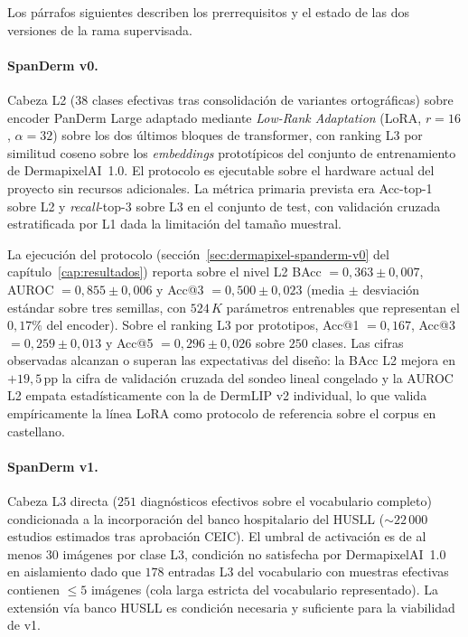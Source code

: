 Los párrafos siguientes describen los prerrequisitos y el estado
de las dos versiones de la rama supervisada.

\paragraph{SpanDerm v0.}
Cabeza L2 ($38$ clases efectivas tras consolidación de
variantes ortográficas) sobre encoder PanDerm Large adaptado
mediante \emph{Low-Rank Adaptation} (LoRA, $r=16$, $\alpha=32$)
sobre los dos últimos bloques de transformer, con ranking L3 por
similitud coseno sobre los \emph{embeddings} prototípicos del
conjunto de entrenamiento de DermapixelAI~1.0. El protocolo es
ejecutable sobre el hardware actual del proyecto sin recursos
adicionales. La métrica primaria prevista era Acc-top-1 sobre L2
y \emph{recall}-top-3 sobre L3 en el conjunto de test, con
validación cruzada estratificada por L1 dada la limitación del
tamaño muestral.

La ejecución del protocolo (secci\'on~\ref{sec:dermapixel-spanderm-v0}
del capítulo~\ref{cap:resultados}) reporta sobre el nivel L2
BAcc $= 0{,}363 \pm 0{,}007$, AUROC $= 0{,}855 \pm 0{,}006$ y
Acc@3 $= 0{,}500 \pm 0{,}023$ (media $\pm$ desviación estándar
sobre tres semillas, con $524\,K$ parámetros entrenables que
representan el $0{,}17\%$ del encoder). Sobre el ranking L3 por
prototipos, Acc@1 $= 0{,}167$, Acc@3 $= 0{,}259 \pm 0{,}013$ y
Acc@5 $= 0{,}296 \pm 0{,}026$ sobre $250$ clases. Las cifras
observadas alcanzan o superan las expectativas del diseño: la
BAcc L2 mejora en $+19{,}5$\,pp la cifra de validación cruzada
del sondeo lineal congelado y la AUROC L2 empata
estadísticamente con la de DermLIP v2 individual, lo que valida
empíricamente la línea LoRA como protocolo de referencia sobre el
corpus en castellano.

\paragraph{SpanDerm v1.}
Cabeza L3 directa ($251$ diagnósticos efectivos sobre el
vocabulario completo) condicionada a la incorporación del banco
hospitalario del HUSLL ($\sim 22\,000$ estudios estimados tras
aprobación CEIC). El umbral de activación es de al menos
$30$ imágenes por clase L3, condición no satisfecha por
DermapixelAI~1.0 en aislamiento dado que $178$ entradas L3 del
vocabulario con muestras efectivas contienen $\leq 5$ imágenes
(cola larga estricta del vocabulario representado). La extensión vía
banco HUSLL es condición necesaria y suficiente para la viabilidad
de v1.

